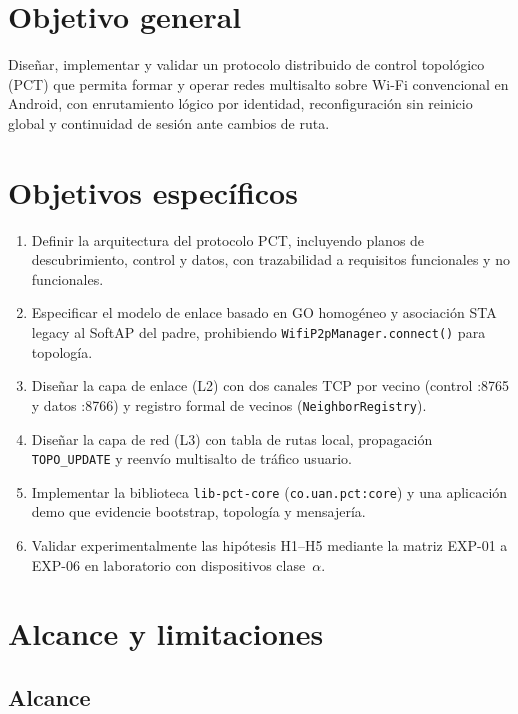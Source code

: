 \section{Objetivo general}
\label{sec:objetivo-general}

Diseñar, implementar y validar un protocolo distribuido de control topológico (PCT) que permita formar y operar redes multisalto sobre Wi-Fi convencional en Android, con enrutamiento lógico por identidad, reconfiguración sin reinicio global y continuidad de sesión ante cambios de ruta.

\section{Objetivos específicos}
\label{sec:objetivos-especificos}

\begin{enumerate}[label=\arabic*.]
  \item Definir la arquitectura del protocolo PCT, incluyendo planos de descubrimiento, control y datos, con trazabilidad a requisitos funcionales y no funcionales.
  \item Especificar el modelo de enlace basado en GO homogéneo y asociación STA legacy al SoftAP del padre, prohibiendo \texttt{WifiP2pManager.connect()} para topología.
  \item Diseñar la capa de enlace (L2) con dos canales TCP por vecino (control :8765 y datos :8766) y registro formal de vecinos (\texttt{NeighborRegistry}).
  \item Diseñar la capa de red (L3) con tabla de rutas local, propagación \texttt{TOPO\_UPDATE} y reenvío multisalto de tráfico usuario.
  \item Implementar la biblioteca \texttt{lib-pct-core} (\texttt{co.uan.pct:core}) y una aplicación demo que evidencie bootstrap, topología y mensajería.
  \item Validar experimentalmente las hipótesis H1--H5 mediante la matriz EXP-01 a EXP-06 en laboratorio con dispositivos clase~$\alpha$.
\end{enumerate}

\section{Alcance y limitaciones}
\label{sec:alcance}

\subsection{Alcance}

